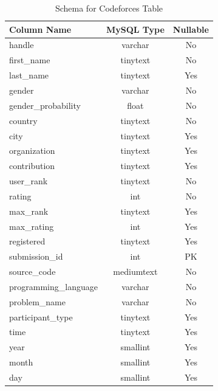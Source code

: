 \documentclass[12pt]{article}
\begin{document}
\begin{table}[h!]
    \begin{center}
        \caption{Schema for Codeforces Table}
        \label{tab:cf_schema}
        \begin{tabular}{|l | c | c |}
            \hline
            \textbf{Column Name} & \textbf{MySQL Type} & \textbf{Nullable}\\
            \hline
            handle & varchar & No\\
            first{\_}name & tinytext & No\\
            last{\_}name & tinytext & Yes\\
            gender & varchar & No\\
            gender{\_}probability & float & No\\
            country & tinytext & No\\
            city & tinytext & Yes\\
            organization & tinytext & Yes\\
            contribution & tinytext & Yes\\
            user{\_}rank & tinytext & No\\
            rating & int & No\\
            max{\_}rank & tinytext & Yes\\
            max{\_}rating & int & Yes\\
            registered & tinytext & Yes\\
            \hline
            submission{\_}id & int & PK\\
            source{\_}code & mediumtext & No\\
            programming{\_}language & varchar & No\\
            problem{\_}name & varchar & No\\
            participant{\_}type & tinytext & Yes\\
            time & tinytext & Yes\\
            year & smallint & Yes\\
            month & smallint & Yes\\
            day & smallint & Yes\\
            \hline
        \end{tabular}
    \end{center}
\end{table}
\end{document}
